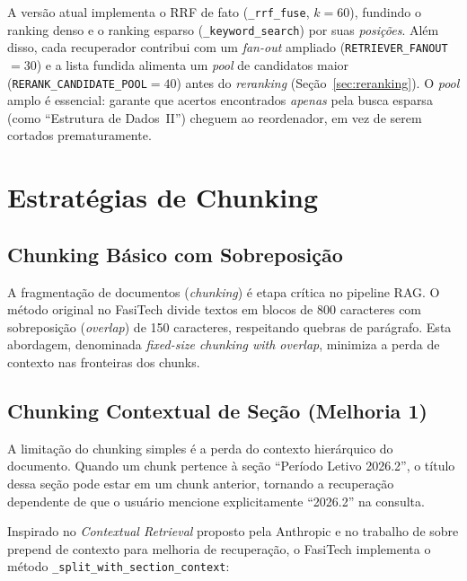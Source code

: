 \documentclass[12pt,a4paper]{report}
\begin{document}
A versão atual implementa o RRF de fato (\texttt{\_rrf\_fuse}, $k=60$), fundindo
o ranking denso e o ranking esparso (\texttt{\_keyword\_search}) por suas
\emph{posições}. Além disso, cada recuperador contribui com um \textit{fan-out}
ampliado (\texttt{RETRIEVER\_FANOUT}$=30$) e a lista fundida alimenta um
\textit{pool} de candidatos maior (\texttt{RERANK\_CANDIDATE\_POOL}$=40$) antes
do \textit{reranking} (Seção~\ref{sec:reranking}). O \textit{pool} amplo é
essencial: garante que acertos encontrados \emph{apenas} pela busca esparsa
(como ``Estrutura de Dados~II'') cheguem ao reordenador, em vez de serem
cortados prematuramente.

\section{Estratégias de Chunking}

\subsection{Chunking Básico com Sobreposição}

A fragmentação de documentos (\textit{chunking}) é etapa crítica no pipeline
RAG. O método original no FasiTech divide textos em blocos de 800 caracteres
com sobreposição (\textit{overlap}) de 150 caracteres, respeitando quebras
de parágrafo. Esta abordagem, denominada \textit{fixed-size chunking with
overlap}, minimiza a perda de contexto nas fronteiras dos chunks.

\subsection{Chunking Contextual de Seção (Melhoria 1)}
\label{sec:melhoria1}

A limitação do chunking simples é a perda do contexto hierárquico do documento.
Quando um chunk pertence à seção ``Período Letivo 2026.2'', o título dessa
seção pode estar em um chunk anterior, tornando a recuperação dependente de
que o usuário mencione explicitamente ``2026.2'' na consulta.

Inspirado no \textit{Contextual Retrieval} proposto pela Anthropic
\autocite{anthropic2024contextual} e no trabalho de \textcite{shi2023large}
sobre prepend de contexto para melhoria de recuperação, o FasiTech implementa
o método \texttt{\_split\_with\_section\_context}:
\end{document}
